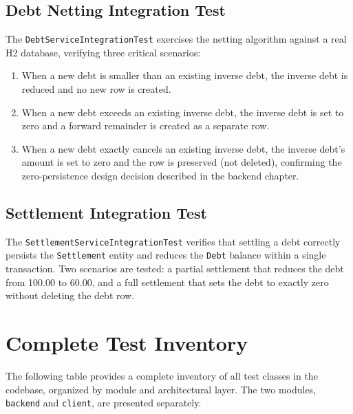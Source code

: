 \subsection{Debt Netting Integration Test}
The \texttt{DebtServiceIntegrationTest} exercises the netting algorithm against a real H2 database, verifying three critical scenarios:
\begin{enumerate}
    \item When a new debt is smaller than an existing inverse debt, the inverse debt is reduced and no new row is created.
    \item When a new debt exceeds an existing inverse debt, the inverse debt is set to zero and a forward remainder is created as a separate row.
    \item When a new debt exactly cancels an existing inverse debt, the inverse debt's amount is set to zero and the row is preserved (not deleted), confirming the zero-persistence design decision described in the backend chapter.
\end{enumerate}

\subsection{Settlement Integration Test}
The \texttt{SettlementServiceIntegrationTest} verifies that settling a debt correctly persists the \texttt{Settlement} entity and reduces the \texttt{Debt} balance within a single transaction. Two scenarios are tested: a partial settlement that reduces the debt from 100.00 to 60.00, and a full settlement that sets the debt to exactly zero without deleting the debt row.


\section{Complete Test Inventory}

The following table provides a complete inventory of all test classes in the codebase, organized by module and architectural layer. The two modules, \texttt{backend} and \texttt{client}, are presented separately.

